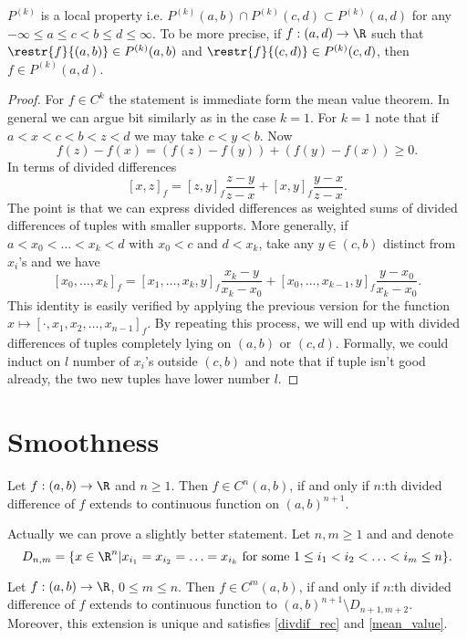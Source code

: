 \begin{prop}
	$P^{(k)}$ is a local property i.e. $P^{(k)}(a, b) \cap P^{(k)}(c, d) \subset P^{(k)}(a, d)$ for any $-\infty \leq a \leq c < b \leq d \leq \infty$. To be more precise, if $f : (a, d) \to \R$ such that $\restr{f}{(a, b)} \in P^{(k)}(a, b)$ and $\restr{f}{(c, d)} \in P^{(k)}(c, d)$, then $f \in P^{(k)}(a, d)$.
\end{prop}
\begin{proof}
	For $f \in C^{k}$ the statement is immediate form the mean value theorem. In general we can argue bit similarly as in the case $k = 1$. For $k = 1$ note that if $a < x < c < b < z < d$ we may take $c < y < b$. Now
	\[
		f(z) - f(x) = (f(z) - f(y)) + (f(y) - f(x)) \geq 0.
	\]
	In terms of divided differences
	\[
		[x, z]_{f} = [z, y]_{f} \frac{z - y}{z - x} + [x, y]_{f} \frac{y - x}{z - x}.
	\]
	The point is that we can express divided differences as weighted sums of divided differences of tuples with smaller supports. More generally, if $a < x_{0} < \ldots < x_{k} < d$ with $x_{0} < c$ and $d < x_{k}$, take any $y \in (c, b)$ distinct from $x_{i}$'s and we have
	\[
		[x_{0}, \ldots, x_{k}]_{f} = [x_{1}, \ldots, x_{k}, y]_{f} \frac{x_{k} - y}{x_{k} - x_{0}} + [x_{0}, \ldots, x_{k - 1}, y]_{f} \frac{y - x_{0}}{x_{k} - x_{0}}.
	\]
	This identity is easily verified by applying the previous version for the function $x \mapsto [\cdot, x_{1}, x_{2}, \ldots, x_{n - 1}]_{f}$. By repeating this process, we will end up with divided differences of tuples completely lying on $(a, b)$ or $(c, d)$. Formally, we could induct on $l$ number of $x_{i}$'s outside $(c, b)$ and note that if tuple isn't good already, the two new tuples have lower number $l$.
\end{proof}

\section{Smoothness}

\begin{lause}
	Let $f : (a, b) \to \R$ and $n \geq 1$. Then $f \in C^{n}(a, b)$, if and only if $n$:th divided difference of $f$ extends to continuous function on $(a, b)^{n + 1}$.
\end{lause}

Actually we can prove a slightly better statement. Let $n, m \geq 1$ and and denote
\[
	D_{n, m} = \{x \in \R^{n} | x_{i_{1}} = x_{i_{2}} = \ldots = x_{i_{k}} \text{ for some $1 \leq i_{1} < i_{2} < \ldots < i_{m} \leq n$} \}.
\]
\begin{lause}
	Let $f : (a, b) \to \R$, $0 \leq m \leq n$. Then $f \in C^{m}(a, b)$, if and only if $n$:th divided difference of $f$ extends to continuous function to $(a, b)^{n + 1} \setminus D_{n + 1, m + 2}$. Moreover, this extension is unique and satisfies \ref{divdif_rec} and \ref{mean_value}.
\end{lause}

